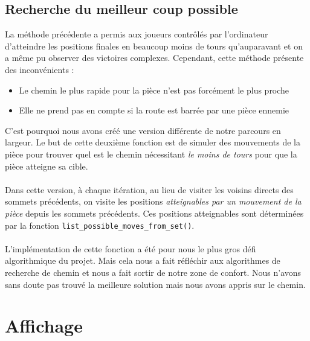 \documentclass{article}
\begin{document}
\subsection{Recherche du meilleur coup possible}

La méthode précédente a permis aux joueurs contrôlés par l'ordinateur d'atteindre les positions finales en beaucoup moins de tours qu'auparavant et on a même pu observer des victoires complexes.
Cependant, cette méthode présente des inconvénients :
\begin{itemize}
    \item Le chemin le plus rapide pour la pièce n'est pas forcément le plus proche
    \item Elle ne prend pas en compte si la route est barrée par une pièce ennemie
    \\
\end{itemize}

C'est pourquoi nous avons créé une version différente de notre parcours en largeur.
Le but de cette deuxième fonction est de simuler des mouvements de la pièce pour trouver quel est le chemin nécessitant \emph{le moins de tours} pour que la pièce atteigne sa cible.
\\\\
Dans cette version, à chaque itération, au lieu de visiter les voisins directs des sommets précédents, on visite les positions \emph{atteignables par un mouvement de la pièce} depuis les sommets précédents.
Ces positions atteignables sont déterminées par la fonction \lstinline{list_possible_moves_from_set()}.
\\\\
L'implémentation de cette fonction a été pour nous le plus gros défi algorithmique du projet. 
Mais cela nous a fait réfléchir aux algorithmes de recherche de chemin et nous a fait sortir de notre zone de confort. 
Nous n'avons sans doute pas trouvé la meilleure solution mais nous avons appris sur le chemin.

\newpage
\section{Affichage} 
\end{document}
